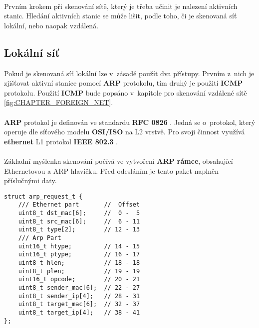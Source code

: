 \documentclass[a4paper,11pt,onecolumn,notitlepage]{article}
\begin{document}
\paragraph{} Prvním krokem při skenování sítě, který je třeba učinit je nalezení aktivních stanic. Hledání aktivních stanic se může lišit, podle toho, či je skenovaná síť lokální, nebo naopak vzdálená.
\subsection{Lokální síť}\label{fig:CHAPTER_LOCAL_NET}
Pokud je skenovaná síť lokální lze v~zásadě použít dva přístupy. Prvním z~nich je zjišťovat aktivní stanice pomocí \textbf{ARP} protokolu, tím druhý je použití \textbf{ICMP} protokolu. Použití \textbf{ICMP} bude popsáno v~kapitole pro skenování vzdálené sítě \ref{fig:CHAPTER_FOREIGN_NET}.

\paragraph{} \textbf{ARP} protokol je definován ve standardu \textbf{RFC 0826} \cite{RFC0826}. Jedná se o~protokol, který operuje dle síťového modelu \textbf{OSI/ISO} \cite{MatousekPetr2014Saaj} na L2 vrstvě. Pro svoji činnost využívá \textbf{ethernet} L1 protokol \textbf{IEEE 802.3} \cite{RFC1042}.

\paragraph{} Základní myšlenka skenování počívá ve vytvoření \textbf{ARP rámce}, obsahující Ethernetovou a ARP hlavičku. Před odesláním je tento paket naplněn příslučnými daty.
\begin{lstlisting}[frame=single,caption={Struktura paketu pro ARP dotaz},captionpos=b]
struct arp_request_t {
    /// Ethernet part       //  Offset
    uint8_t dst_mac[6];     //  0 -  5
    uint8_t src_mac[6];     //  6 - 11
    uint8_t type[2];        // 12 - 13
    /// Arp Part
    uint16_t htype;         // 14 - 15
    uint16_t ptype;         // 16 - 17
    uint8_t hlen;           // 18 - 18
    uint8_t plen;           // 19 - 19
    uint16_t opcode;        // 20 - 21
    uint8_t sender_mac[6];  // 22 - 27
    uint8_t sender_ip[4];   // 28 - 31
    uint8_t target_mac[6];  // 32 - 37
    uint8_t target_ip[4];   // 38 - 41
};
\end{lstlisting}\label{fig:ARP_PACKET}
\end{document}
